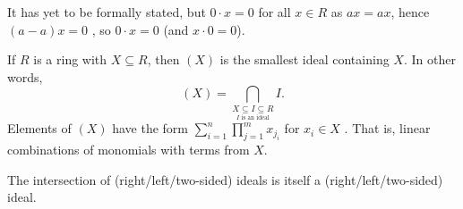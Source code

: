 \begin{remark}
	It has yet to be formally stated, but \(0 \cdot x = 0\) for all \(x \in R\) as \(ax = ax\), hence \(\left( a - a \right) x = 0\) , so \(0 \cdot x = 0\) (and \(x \cdot 0 = 0\)).
\end{remark}
\begin{definition}
	If \(R\) is a ring with \(X \subseteq R\), then \(\left( X \right) \) is the smallest ideal containing \(X\). In other words, \[
		\left( X \right) = \bigcap_{\underset{I \text{ is an ideal}}{X \subseteq I \subseteq R}} I
	.\]
	Elements of \(\left( X \right) \) have the form \(\sum_{i=1}^{n} \prod_{j=1}^{m} x_{j_{i}}  \) for \(x_{i} \in X\) . That is, linear combinations of monomials with terms from \(X\).
\end{definition}
\begin{remark}
	The intersection of (right/left/two-sided) ideals is itself a (right/left/two-sided) ideal.
\end{remark}

